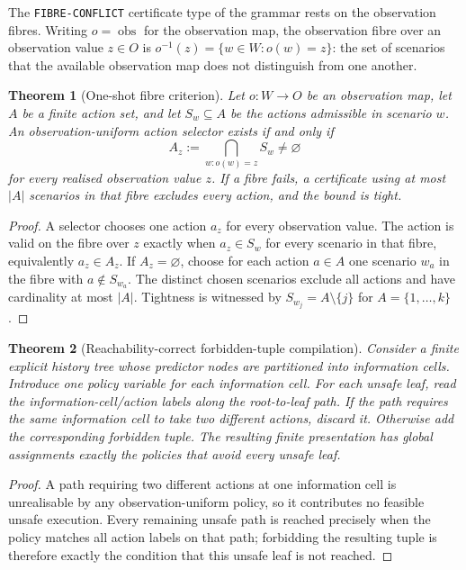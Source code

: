 \documentclass[11pt]{article}
\theoremstyle{plain}
\newtheorem{theorem}{Theorem}[section]
\theoremstyle{definition}
\theoremstyle{remark}
\begin{document}
The \texttt{FIBRE-CONFLICT} certificate type of the grammar rests on the
observation fibres.  Writing \(o=\operatorname{obs}\) for the observation map,
the observation fibre over an observation value \(z\in O\) is
\(o^{-1}(z)=\{w\in W:o(w)=z\}\): the set of scenarios that the available
observation map does not distinguish from one another.

\begin{theorem}[One-shot fibre criterion]
\label{thm:fibre-criterion}
Let \(o:W\to O\) be an observation map, let \(A\) be a finite action set, and
let \(S_w\subseteq A\) be the actions admissible in scenario \(w\).  An
observation-uniform action selector exists if and only if
\[
  A_z:=\bigcap_{w:o(w)=z}S_w\ne\varnothing
\]
for every realised observation value \(z\).  If a fibre fails, a certificate
using at most \(|A|\) scenarios in that fibre excludes every action, and the
bound is tight.
\end{theorem}

\begin{proof}
A selector chooses one action \(a_z\) for every observation value.  The action is
valid on the fibre over \(z\) exactly when \(a_z\in S_w\) for every scenario in
that fibre, equivalently \(a_z\in A_z\).  If \(A_z=\varnothing\), choose for each
action \(a\in A\) one scenario \(w_a\) in the fibre with \(a\notin S_{w_a}\).
The distinct chosen scenarios exclude all actions and have cardinality at most
\(|A|\).  Tightness is witnessed by \(S_{w_j}=A\setminus\{j\}\) for
\(A=\{1,\ldots,k\}\).
\end{proof}

\begin{theorem}[Reachability-correct forbidden-tuple compilation]
Consider a finite explicit history tree whose predictor nodes are partitioned
into information cells.  Introduce one policy variable for each information
cell.  For each unsafe leaf, read the information-cell/action labels along the
root-to-leaf path.  If the path requires the same information cell to take two
different actions, discard it.  Otherwise add the corresponding forbidden tuple.
The resulting finite presentation has global assignments exactly the policies
that avoid every unsafe leaf.
\end{theorem}

\begin{proof}
A path requiring two different actions at one information cell is unrealisable
by any observation-uniform policy, so it contributes no feasible unsafe
execution.  Every remaining unsafe path is reached precisely when the policy
matches all action labels on that path; forbidding the resulting tuple is
therefore exactly the condition that this unsafe leaf is not reached.
\end{proof}
\end{document}
